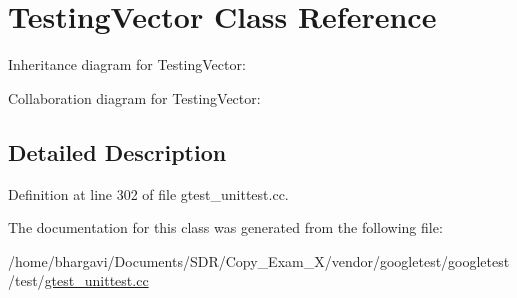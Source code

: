 \hypertarget{class_testing_vector}{}\section{Testing\+Vector Class Reference}
\label{class_testing_vector}


Inheritance diagram for Testing\+Vector\+:


Collaboration diagram for Testing\+Vector\+:


\subsection{Detailed Description}


Definition at line 302 of file gtest\+\_\+unittest.\+cc.



The documentation for this class was generated from the following file\+:\begin{DoxyCompactItemize}
\item 
/home/bhargavi/\+Documents/\+S\+D\+R/\+Copy\+\_\+\+Exam\+\_\+X/vendor/googletest/googletest/test/\hyperlink{gtest__unittest_8cc}{gtest\+\_\+unittest.\+cc}\end{DoxyCompactItemize}
